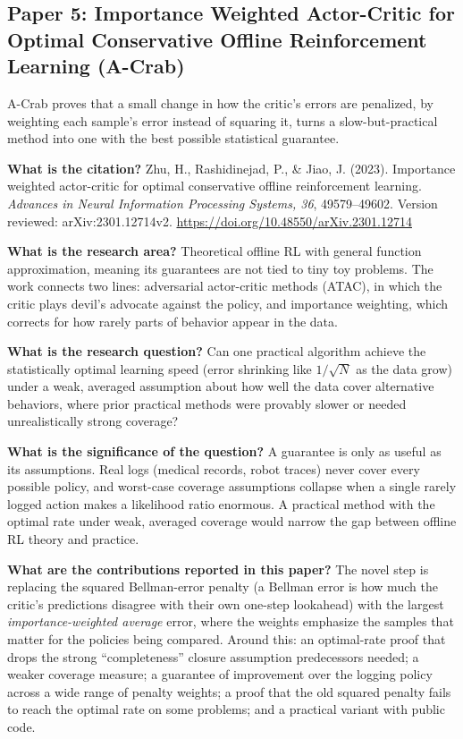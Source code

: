 \documentclass[11pt]{article}
\newcommand{\paper}[1]{\subsection*{#1}}
\newcommand{\q}[2]{\item \textbf{#1} #2}
\begin{document}
\paper{Paper 5: Importance Weighted Actor-Critic for Optimal Conservative Offline Reinforcement Learning (A-Crab)}
A-Crab proves that a small change in how the critic's errors are penalized, by weighting each sample's error instead of squaring it, turns a slow-but-practical method into one with the best possible statistical guarantee.
\begin{qna}

\q{What is the citation?}
Zhu, H., Rashidinejad, P., \& Jiao, J. (2023). Importance weighted actor-critic for optimal conservative offline reinforcement learning. \emph{Advances in Neural Information Processing Systems, 36}, 49579--49602. Version reviewed: arXiv:2301.12714v2. \url{https://doi.org/10.48550/arXiv.2301.12714}

\q{What is the research area?}
Theoretical offline RL with general function approximation, meaning its guarantees are not tied to tiny toy problems. The work connects two lines: adversarial actor-critic methods (ATAC), in which the critic plays devil's advocate against the policy, and importance weighting, which corrects for how rarely parts of behavior appear in the data.

\q{What is the research question?}
Can one practical algorithm achieve the statistically optimal learning speed (error shrinking like $1/\sqrt{N}$ as the data grow) under a weak, averaged assumption about how well the data cover alternative behaviors, where prior practical methods were provably slower or needed unrealistically strong coverage?

\q{What is the significance of the question?}
A guarantee is only as useful as its assumptions. Real logs (medical records, robot traces) never cover every possible policy, and worst-case coverage assumptions collapse when a single rarely logged action makes a likelihood ratio enormous. A practical method with the optimal rate under weak, averaged coverage would narrow the gap between offline RL theory and practice.

\q{What are the contributions reported in this paper?}
The novel step is replacing the squared Bellman-error penalty (a Bellman error is how much the critic's predictions disagree with their own one-step lookahead) with the largest \emph{importance-weighted average} error, where the weights emphasize the samples that matter for the policies being compared. Around this: an optimal-rate proof that drops the strong ``completeness'' closure assumption predecessors needed; a weaker coverage measure; a guarantee of improvement over the logging policy across a wide range of penalty weights; a proof that the old squared penalty fails to reach the optimal rate on some problems; and a practical variant with public code.


\end{qna}
\end{document}
